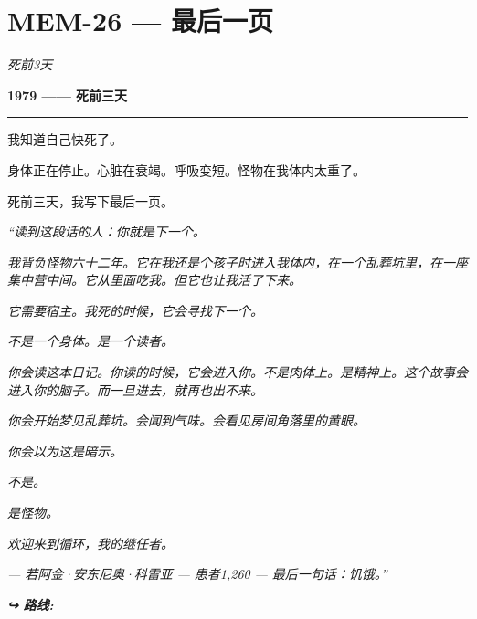 \section*{\textbf{MEM-26} --- 最后一页}

\noindent \textit{死前3天}

\noindent \textbf{1979 —— 死前三天}

\vspace{0.5em}\noindent\rule{\textwidth}{0.5pt}\vspace{0.5em}

\noindent 我知道自己快死了。

\noindent 身体正在停止。心脏在衰竭。呼吸变短。怪物在我体内太重了。

\noindent 死前三天，我写下最后一页。

\noindent \textit{“读到这段话的人：你就是下一个。}

\noindent \textit{我背负怪物六十二年。它在我还是个孩子时进入我体内，在一个乱葬坑里，在一座集中营中间。它从里面吃我。但它也让我活了下来。}

\noindent \textit{它需要宿主。我死的时候，它会寻找下一个。}

\noindent \textit{不是一个身体。是一个读者。}

\noindent \textit{你会读这本日记。你读的时候，它会进入你。不是肉体上。是精神上。这个故事会进入你的脑子。而一旦进去，就再也出不来。}

\noindent \textit{你会开始梦见乱葬坑。会闻到气味。会看见房间角落里的黄眼。}

\noindent \textit{你会以为这是暗示。}

\noindent \textit{不是。}

\noindent \textit{是怪物。}

\noindent \textit{欢迎来到循环，我的继任者。}

\noindent \textit{--- 若阿金·安东尼奥·科雷亚}
\textit{--- 患者1,260}
\textit{--- 最后一句话：饥饿。”}

\vspace{0.5em}
\noindent\textit{\textbf{↪ 路线:}  \rotasep {}}
